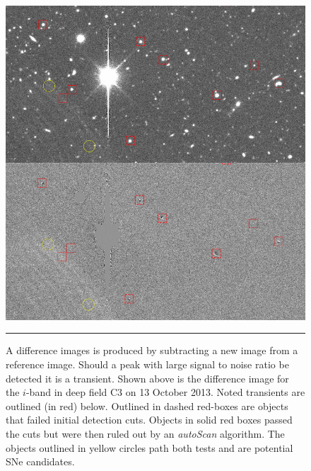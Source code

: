 \begin{figure}[htbp]
	\centering
		\includegraphics[width = 1.0\textwidth]{./Figures/Transient_detection_The_difference_imaging_pipeline_for_the_transient_search.jpg}
		\rule{35em}{0.5pt}
	\caption[Transient Classification]{A difference images is produced by subtracting a new image from a reference image. Should a peak with large signal to noise ratio be detected it is a transient. Shown above is the difference image for the $i$-band in deep field C3 on 13 October 2013. Noted transients are outlined (in red) below. Outlined in dashed red-boxes are objects that failed initial detection cuts. Objects in solid red boxes passed the cuts but were then ruled out by an \textit{autoScan} algorithm. The objects outlined in yellow circles path both tests and are potential SNe candidates.}
	\label{fig:transient_detection}
\end{figure}

